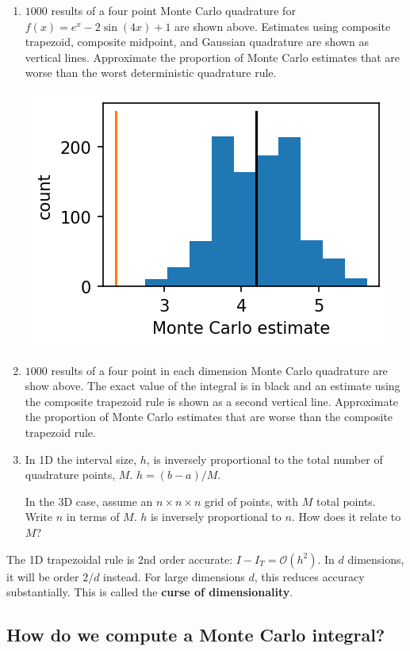 \documentclass[12pt,letterpaper,noanswers]{exam}
\begin{document}
\begin{enumerate}
\item $1000$ results of a four point Monte Carlo quadrature for $f(x) = e^x - 2\sin(4x) + 1$ are shown above.  Estimates using composite trapezoid, composite midpoint, and Gaussian quadrature are shown as vertical lines.  Approximate the proportion of Monte Carlo estimates that are worse than the worst deterministic quadrature rule.

\includegraphics{AM111-F23-CourseNotes/img/C16-MC64pts.png}
\item $1000$ results of a four point in each dimension Monte Carlo quadrature are show above.  The exact value of the integral is in black and an estimate using the composite trapezoid rule is shown as a second vertical line.  Approximate the proportion of Monte Carlo estimates that are worse than the composite trapezoid rule.

\item In 1D the interval size, $h$, is inversely proportional to the total number of quadrature points, $M$.  $h = (b-a)/M$.

In the 3D case, assume an $n\times n\times n$ grid of points, with $M$ total points.  Write $n$ in terms of $M$.  $h$ is inversely proportional to $n$.  How does it relate to $M$?

\end{enumerate}

The 1D trapezoidal rule is 2nd order accurate: $I - I_T = \mathcal{O}(h^2)$.  In $d$ dimensions, it will be order $2/d$ instead.  For large dimensions $d$, this reduces accuracy substantially.  This is called the \textbf{curse of dimensionality}.

\subsection*{How do we compute a Monte Carlo integral?}
\end{document}
